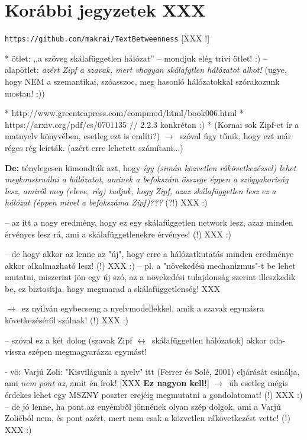 \documentclass{llncs}
\newcommand{\nyil}{$\rightarrow$\ }
\newcommand{\nnyil}{$\leftrightarrow$\ }
\newcommand{\code}[1]{\texttt{\small #1}}
\newcommand{\embf}[1]{\textbf{#1}}
\newcommand{\XXX}[1]{{\small \color{megjcolor} [XXX #1]}}
\newcommand{\XXXb}[1]{\XXX{\embf{#1}}}
\newcommand{\XXXf}{\XXX{!}\ }
\newcommand{\smp}[1]{{\small (#1)}}
\begin{document}
\newpage %

\section{Korábbi jegyzetek XXX}

\code{https://github.com/makrai/TextBetweenness} \XXXf

 * ötlet: ,,a szöveg skálafüggetlen hálózat'' -- mondjuk elég trivi ötlet! :)
 -- alapötlet:
    \emph{azért Zipf a szavak, mert vhogyan skálafgtlen hálózatot alkot!}
    \smp{ugye, hogy NEM a szemantikai, szóasszoc, meg hasonló hálózatokkal
         szórakozunk mostan! :)}

 * http://www.greenteapress.com/compmod/html/book006.html
 * https://arxiv.org/pdf/cs/0701135 // 2.2.3 konkrétan :)
 * (Kornai sok Zipf-et ír a matnyelv könyvében, esetleg ezt is említi?)
 \nyil szóval úgy tűnik, hogy ezt már réges rég leírták.
    (azért erre lehetett számítani...)

 \embf{De:} ténylegesen kimondták azt, hogy
 \emph{így (simán közvetlen rákövetkezéssel)
 lehet megkonstruálni a hálózatot, aminek a befokszám összege
 éppen a szógyakoriság lesz, amiről meg (eleve, rég) tudjuk, hogy Zipf,
 azaz skálafüggetlen lesz ez a hálózat
 (éppen mivel a befokszáma Zipf)???} (?!) XXX :)

 -- az itt a nagy eredmény, hogy ez egy skálafüggetlen network lesz, azaz
    minden érvényes lesz rá, ami a skálafüggetlenekre érvényes! (!) XXX :)

 -- de hogy akkor az lenne az "új", hogy erre a hálózatkutatás
    minden eredménye akkor alkalmazható lesz! (!) XXX :)
    -- pl. a "növekedési mechanizmus"-t be lehet mutatni,
       miszerint jön egy új szó, az a növekedési tulajdonság szerint
       illeszkedik be, ez biztosítja, hogy megmarad a skálafüggetlenség! XXX

 \nyil ez nyilván egybecseng a nyelvmodellekkel,
    amik a szavak egymásra következéséről szólnak! (!) XXX :)

 -- szóval ez a két dolog (szavak Zipf \nnyil skálafüggetlen hálózatok)
    akkor oda-vissza szépen megmagyarázza egymást!

 - vö: Varjú Zoli: "Kisvilágunk a nyelv"
   itt (Ferrer és Solé, 2001) eljárását csinálja,
   ami  \emph{nem pont az}, amit én írok! \XXXb{Ez nagyon kell!}
   \nyil úh esetleg mégis érdekes lehet
      egy MSZNY poszter erejéig megmutatni a gondolatomat! (!) XXX :)
   -- de jó lenne, ha pont az enyémből jönnének olyan szép dolgok,
      ami a Varjú Zoliéból nem, és pont azért, mert
      nem csak a közvetlen rákövetkezést vette! (!) XXX :)
\end{document}
